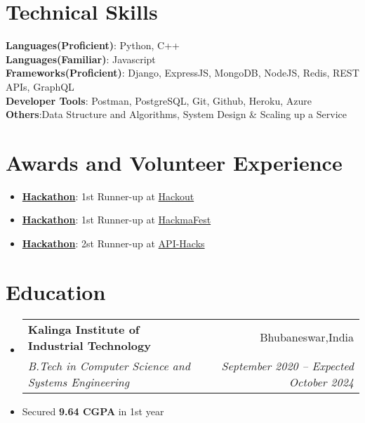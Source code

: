 \documentclass[letterpaper,11pt]{article}
\makeatletter
\newcommand{\resumeItem}[1]{
  \item\small{
    {#1 \vspace{-2pt}}
  }
}
\newcommand{\resumeSubheading}[4]{
  \vspace{-2pt}\item
    \begin{tabular*}{0.97\textwidth}[t]{l@{\extracolsep{\fill}}r}
      \textbf{#1} & #2 \\
      \textit{\small#3} & \textit{\small #4} \\
    \end{tabular*}\vspace{-7pt}
}
\newcommand{\resumeSubHeadingListStart}{\begin{itemize}[leftmargin=0.15in, label={}]}
\newcommand{\resumeSubHeadingListEnd}{\end{itemize}}
\newcommand{\resumeItemListStart}{\begin{itemize}}
\newcommand{\resumeItemListEnd}{\end{itemize}\vspace{-5pt}}
\makeatother
\begin{document}
%
\section{Technical Skills}
 \begin{itemize}[leftmargin=0.15in, label={}]
    \small{\item{
     \textbf{Languages(Proficient)}{: Python, C++} \\
      \textbf{Languages(Familiar)}{: Javascript} \\
     \textbf{Frameworks(Proficient)}{: Django, ExpressJS, MongoDB, NodeJS, Redis, REST APIs, GraphQL} \\
     \textbf{Developer Tools}{: Postman, PostgreSQL, Git, Github, Heroku, Azure} \\
     \textbf{Others}{:Data Structure and Algorithms, System Design & Scaling up a Service}
    }}
 \end{itemize}

\section{Awards and Volunteer Experience }
 \begin{itemize}[leftmargin=0.15in, label={}]
    \small{\item{
        \resumeItemListStart
                \resumeItem{\textbf{\href{Link if any}{Hackathon}}: 1st Runner-up at \href{https://www.hackout.io/}{Hackout}}
                \resumeItem{\textbf{\href{Link if any}{Hackathon}}: 1st Runner-up at \href{https://hackmafest.tech/}{HackmaFest}}
                \resumeItem{\textbf{\href{Link if any}{Hackathon}}: 2st Runner-up at \href{https://apihacks.co/}{API-Hacks}}
      \resumeItemListEnd
    }}
 \end{itemize}
 
\section{Education}
  \resumeSubHeadingListStart
    \resumeSubheading
      {Kalinga Institute of Industrial Technology}{Bhubaneswar,India}
      {B.Tech in Computer Science and Systems Engineering}{September 2020 -- Expected October 2024}
      \resumeItem{Secured \textbf{9.64 CGPA} in 1st year}
  \resumeSubHeadingListEnd
\end{document}
